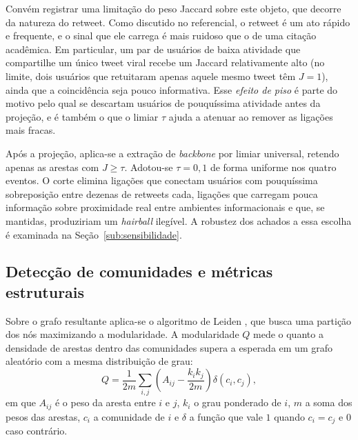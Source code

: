 \documentclass[conference]{IEEEtran}
\begin{document}
Convém registrar uma limitação do peso Jaccard sobre este objeto, que decorre da natureza do retweet. Como discutido no referencial, o retweet é um ato rápido e frequente, e o sinal que ele carrega é mais ruidoso que o de uma citação acadêmica. Em particular, um par de usuários de baixa atividade que compartilhe um único tweet viral recebe um Jaccard relativamente alto (no limite, dois usuários que retuitaram apenas aquele mesmo tweet têm $J=1$), ainda que a coincidência seja pouco informativa. Esse \emph{efeito de piso} é parte do motivo pelo qual se descartam usuários de pouquíssima atividade antes da projeção, e é também o que o limiar $\tau$ ajuda a atenuar ao remover as ligações mais fracas.

Após a projeção, aplica-se a extração de \emph{backbone} por limiar universal, retendo apenas as arestas com $J \ge \tau$. Adotou-se $\tau = 0{,}1$ de forma uniforme nos quatro eventos. O corte elimina ligações que conectam usuários com pouquíssima sobreposição entre dezenas de retweets cada, ligações que carregam pouca informação sobre proximidade real entre ambientes informacionais e que, se mantidas, produziriam um \emph{hairball} ilegível. A robustez dos achados a essa escolha é examinada na Seção~\ref{sub:sensibilidade}.

\subsection{Detecção de comunidades e métricas estruturais}
\label{sub:metricas}

Sobre o grafo resultante aplica-se o algoritmo de Leiden \cite{b_traag2019}, que busca uma partição dos nós maximizando a modularidade. A modularidade $Q$ mede o quanto a densidade de arestas dentro das comunidades supera a esperada em um grafo aleatório com a mesma distribuição de grau:
\begin{equation}
Q = \frac{1}{2m}\sum_{i,j}\left(A_{ij} - \frac{k_i k_j}{2m}\right)\delta(c_i,c_j),
\label{eq:modularidade}
\end{equation}
em que $A_{ij}$ é o peso da aresta entre $i$ e $j$, $k_i$ o grau ponderado de $i$, $m$ a soma dos pesos das arestas, $c_i$ a comunidade de $i$ e $\delta$ a função que vale $1$ quando $c_i = c_j$ e $0$ caso contrário.
\end{document}
